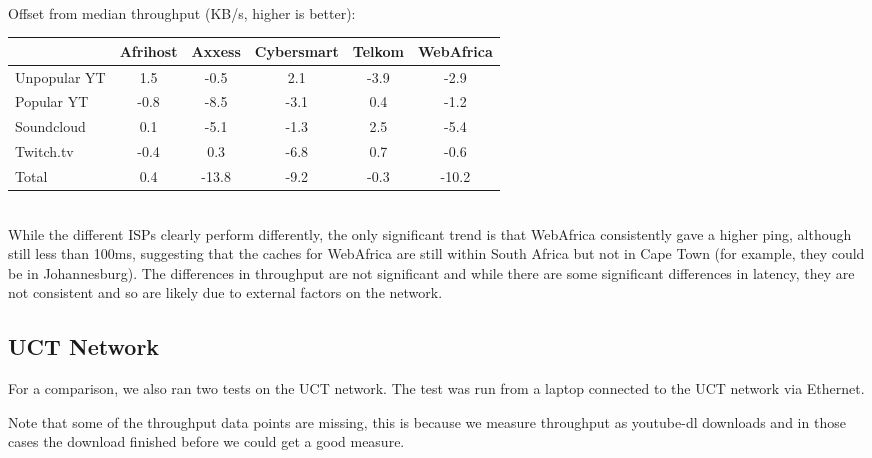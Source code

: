 \documentclass{sig-alternate-05-2015}
\begin{document}
\vspace{1em} \\
Offset from median throughput (KB/s, higher is better): \\
\begin{tabular}{|l|c|c|c|c|c|} \hline
 & \small{Afrihost} & \small{Axxess} & \small{Cybersmart} & \small{Telkom} & \small{WebAfrica} \\ \hline
\small{Unpopular YT} & 1.5  & -0.5  & 2.1   & -3.9 & -2.9 \\ \hline
Popular YT           & -0.8 & -8.5  & -3.1  & 0.4  & -1.2 \\ \hline
Soundcloud           & 0.1  & -5.1  & -1.3  & 2.5  & -5.4 \\ \hline
Twitch.tv            & -0.4 & 0.3   & -6.8  & 0.7  & -0.6 \\ \hline
Total                & 0.4  & -13.8 & -9.2  & -0.3 & -10.2\\ \hline
\end{tabular}
\vspace{1em} \\
While the different ISPs clearly perform differently, the only significant trend is that WebAfrica consistently gave a higher ping, although still less than 100ms, suggesting that the caches for WebAfrica are still within South Africa but not in Cape Town (for example, they could be in Johannesburg). The differences in throughput are not significant and while there are some significant differences in latency, they are not consistent and so are likely due to external factors on the network.

\subsection{UCT Network}
For a comparison, we also ran two tests on the UCT network. The test was run from a laptop connected to the UCT network via Ethernet.

Note that some of the throughput data points are missing, this is because we measure throughput as youtube-dl downloads and in those cases the download finished before we could get a good measure.
\end{document}
